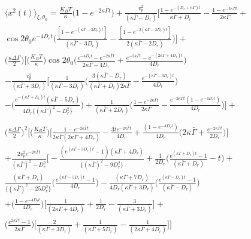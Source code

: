 \documentclass[]{article}
\begin{document}
\begin{equation}
\begin{split}
\langle x^2(t)\rangle_{\xi,\theta_0} =\frac{K_B T}{\kappa}\bigg(1- e^{-2\kappa\bar \Gamma t}\bigg) +\frac{v_p^2}{(\kappa \bar \Gamma-D_r)} \Bigg[ \frac{1-e^{-(D_r+\kappa \bar \Gamma)t}}{\kappa \bar \Gamma+D_r}-\frac{1-e^{-2\kappa \bar \Gamma t}}{2\kappa \bar \Gamma}+\\ \cos 2\theta_0 e^{-4D_rt} \bigg(\frac{[1-e^{-(\kappa \bar \Gamma -3D_r)t}]}{(\kappa \bar \Gamma -3D_r)}-\frac{[1-e^{-2(\kappa \bar \Gamma-2D_r) t}]}{2(\kappa \bar \Gamma-2D_r)}\bigg)\Bigg]+ \\ \bigg(\frac{\kappa \Delta \Gamma}{2} \bigg)\Bigg[\bigg( \frac{K_B T}{\kappa} \bigg) \cos 2 \theta_0\Bigg(\frac{e^{-4D_r t}-e^{-2\kappa \bar \Gamma t}}{2\kappa \bar \Gamma-4D_r}+\frac{e^{-2\kappa \bar \Gamma t}-e^{-(2\kappa \bar \Gamma +4D_r)t}}{4D_r}\Bigg)\\ -\frac{v_p^2}{(\kappa \bar \Gamma+3D_r)}\Bigg[\frac{1}{(\kappa \bar \Gamma-3D_r)}\Bigg(\frac{3(\kappa \bar \Gamma -D_r)}{(\kappa \bar \Gamma +D_r)2\kappa \bar \Gamma}-\frac{e^{-(\kappa \bar \Gamma -3D_r)t}}{4D_r}\Bigg)\\-\Bigg(\frac{e^{-(\kappa \bar \Gamma +D_r)t}(\kappa \bar \Gamma -5D_r)}{4D_r\{(\kappa \bar \Gamma)^2 -D_r^2\}}\Bigg)+\frac{1}{(\kappa \bar \Gamma+2D_r)}\Bigg(\frac{1-e^{-2\kappa \bar \Gamma t}}{2\kappa \bar \Gamma}-\frac{e^{-2\kappa \bar \Gamma t}(1-e^{-4D_r t})}{4D_r} \Bigg) \Bigg]+\\ \\\bigg(\frac{\kappa \Delta \Gamma }{2}\bigg)^2\Bigg[\bigg(\frac{K_BT}{\kappa}\bigg)\Bigg[\frac{1-e^{-2\kappa \bar \Gamma t}}{2\kappa\bar \Gamma(2\kappa\bar \Gamma+4D_r)}-\frac{3te^{-2\kappa \bar \Gamma t}}{4D_r}+\frac{(1-e^{-4D_rt})}{4D_r}\bigg(2\kappa \bar \Gamma +\frac{e^{-2\kappa \bar \Gamma t}}{2D_r}\bigg) \bigg]\\+\frac{2v_p^2 e^{-2\kappa \bar \Gamma t}}{(\kappa \bar\Gamma)^2 -D_r^2}\Bigg[ -\frac{(e^{(\kappa \bar\Gamma -3D_r)t}-1)(\kappa \bar\Gamma +4D_r)}{\{(\kappa \bar\Gamma)^2 -9D_r^2 \}} +\frac{1}{2D_r}\bigg(\frac{e^{(\kappa \bar\Gamma +D_r)t}-1}{(\kappa \bar\Gamma +D_r)}-t\bigg) +\\ 
\frac{(\kappa \bar\Gamma +D_r)}{\{(\kappa \bar\Gamma)^2 -25D_r^2\}} \bigg(\frac{e^{(\kappa \bar\Gamma -5D_r)t}-1}{4D_r} \bigg)-\frac{(\kappa \bar\Gamma +7D_r)}{4D_r(\kappa \bar\Gamma +3D_r)}\bigg(\frac{e^{(\kappa \bar\Gamma -D_r)t}-1}{(\kappa \bar\Gamma -D_r)}\bigg)\\ +\bigg(\frac{1-e^{-4D_r t}}{4D_r}\bigg)\bigg[\frac{1}{(2\kappa \bar\Gamma +4D_r)}+\frac{1}{2D_r}-\frac{3}{(\kappa \bar\Gamma +3D_r)}\bigg]+\\\bigg(\frac{ e^{2\kappa \bar\Gamma t}-1}{2\kappa \bar\Gamma}\bigg)\bigg[\frac{2}{(\kappa \bar\Gamma +3D_r)}+\frac{1}{(\kappa \bar\Gamma +5D_r)}- \frac{1}{(2\kappa \bar\Gamma +4D_r)} \bigg]\Bigg]

\end{split}
\end{equation}
\end{document}
